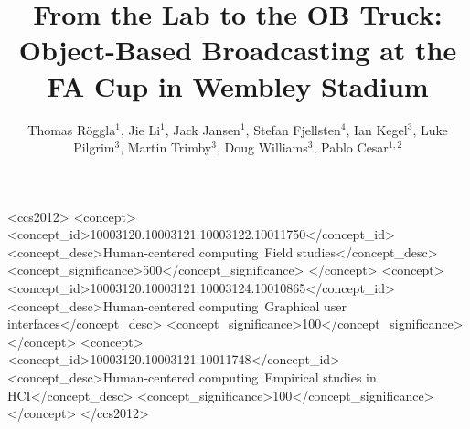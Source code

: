 \documentclass[sigchi-a, authorversion]{acmart}
\begin{document}
\title{From the Lab to the OB Truck: Object-Based Broadcasting at the FA Cup in Wembley Stadium}

\author{Thomas R\"{o}ggla$^1$, Jie Li$^1$, Jack Jansen$^1$, Stefan Fjellsten$^4$, Ian Kegel$^3$, Luke Pilgrim$^3$, Martin Trimby$^3$, Doug Williams$^3$, Pablo Cesar$^{1,2}$}


\renewcommand{\shortauthors}{T. R\"{o}ggla et al.}


%
%
\begin{CCSXML}
    <ccs2012>
        <concept>
            <concept_id>10003120.10003121.10003122.10011750</concept_id>
            <concept_desc>Human-centered computing~Field studies</concept_desc>
            <concept_significance>500</concept_significance>
        </concept>
        <concept>
            <concept_id>10003120.10003121.10003124.10010865</concept_id>
            <concept_desc>Human-centered computing~Graphical user interfaces</concept_desc>
            <concept_significance>100</concept_significance>
        </concept>
        <concept>
            <concept_id>10003120.10003121.10011748</concept_id>
            <concept_desc>Human-centered computing~Empirical studies in HCI</concept_desc>
            <concept_significance>100</concept_significance>
        </concept>
    </ccs2012>
\end{CCSXML}

\end{document}
